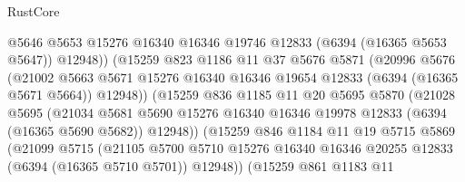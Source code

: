 \begin{lexlean}{RustCore}
\begin{coremodule}
                            @5646
                            @5653
                            @15276
                            @16340
                            @16346
                            @19746
                            @12833
                            (@6394 (@16365 @5653 @5647))
                            @12948))
                        (@15259
                          @823
                          @1186
                          @11
                          @37
                          @5676
                          @5871
                          (@20996
                            @5676
                            (@21002
                              @5663
                              @5671
                              @15276
                              @16340
                              @16346
                              @19654
                              @12833
                              (@6394 (@16365 @5671 @5664))
                              @12948))
                          (@15259
                            @836
                            @1185
                            @11
                            @20
                            @5695
                            @5870
                            (@21028
                              @5695
                              (@21034
                                @5681
                                @5690
                                @15276
                                @16340
                                @16346
                                @19978
                                @12833
                                (@6394 (@16365 @5690 @5682))
                                @12948))
                            (@15259
                              @846
                              @1184
                              @11
                              @19
                              @5715
                              @5869
                              (@21099
                                @5715
                                (@21105
                                  @5700
                                  @5710
                                  @15276
                                  @16340
                                  @16346
                                  @20255
                                  @12833
                                  (@6394 (@16365 @5710 @5701))
                                  @12948))
                              (@15259
                                @861
                                @1183
                                @11

\end{coremodule}
\end{lexlean}
